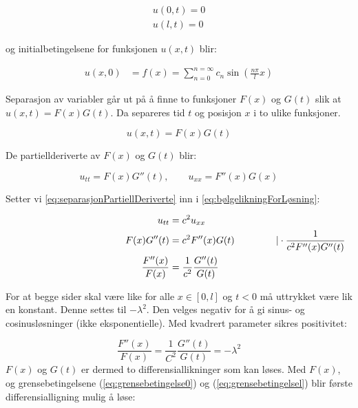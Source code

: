 \begin{align}
	u(0 , t) = 0 \label{eq:grensebetingelse0}\\
	u(l , t) = 0 \label{eq:grensebetingelsel}
\end{align}

og initialbetingelsene for funksjonen $u(x,t)$ blir:

\begin{align}
	u(x , 0) &= f(x) = \sum_{n=0}^{n=\infty} c_n \sin \left( \frac{n \pi}{l} x \right) 	
	\label{eq:initialbetingelse1}
\end{align}

Separasjon av variabler går ut på å finne to funksjoner $F(x)$ og $G(t)$ slik at $u(x , t)=F(x)G(t)$.
Da separeres tid $t$ og posisjon $x$ i to ulike funksjoner.

\begin{equation*}
	u(x , t) = F(x)G(t)
\end{equation*}

De partiellderiverte av $F(x)$ og $G(t)$ blir:

\begin{equation}
	u_{tt} = F(x)G''(t), \qquad u_{xx} = F''(x)G(x)
	\label{eq:separasjonPartiellDeriverte}	
\end{equation}

Setter vi \eqref{eq:separasjonPartiellDeriverte} inn i \eqref{eq:bølgelikningForLøsning}:

\begin{align*}
  \hspace{35ex}
  u_{tt} &= c^2 u_{xx} \\
  \hspace{2ex} F(x)G''(t) &= c^2 F''(x)G(t) \hspace{10ex} \vert 
  \cdot \frac{1}{c^2 F''(x) G''(t)} \\
  \frac{F''(x)}{F(x)} &= \frac{1}{c^2} \frac{G''(t)}{G(t)}
\end{align*}

For at begge sider skal være like for alle $x \in \left[ 0 , l \right]$ og $t < 0$ må uttrykket være lik en
konstant. Denne settes til $- \lambda^2$. Den velges negativ for å gi sinus- og cosinusløsninger (ikke
eksponentielle). Med kvadrert parameter sikres positivitet:

\begin{equation*}
	\frac{F''(x)}{F(x)} = \frac{1}{C^2} \frac{G''(t)}{G(t)} = - \lambda^2
\end{equation*}
\clearpage
$F(x)$ og $G(t)$ er dermed to differensiallikninger som kan løses. Med $F(x)$, og
grensebetingelsene (\ref{eq:grensebetingelse0}) og (\ref{eq:grensebetingelsel}) blir første differensialligning mulig å løse:

